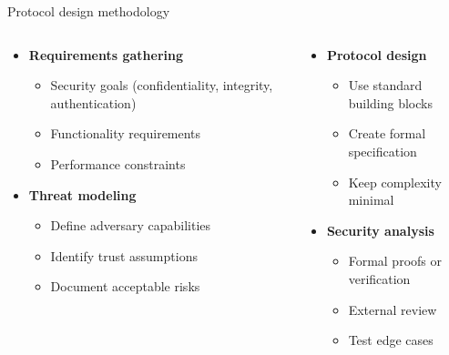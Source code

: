 \documentclass[aspectratio=169, lualatex, handout]{beamer}
\begin{document}
\begin{frame}{Protocol design methodology}
	\begin{columns}[c]
		\begin{column}{0.5\textwidth}
			\begin{itemize}
				\item \textbf{Requirements gathering}
				      \begin{itemize}
					      \item Security goals (confidentiality, integrity, authentication)
					      \item Functionality requirements
					      \item Performance constraints
				      \end{itemize}
				\item \textbf{Threat modeling}
				      \begin{itemize}
					      \item Define adversary capabilities
					      \item Identify trust assumptions
					      \item Document acceptable risks
				      \end{itemize}
			\end{itemize}
		\end{column}
		\begin{column}{0.5\textwidth}
			\begin{itemize}
				\item \textbf{Protocol design}
				      \begin{itemize}
					      \item Use standard building blocks
					      \item Create formal specification
					      \item Keep complexity minimal
				      \end{itemize}
				\item \textbf{Security analysis}
				      \begin{itemize}
					      \item Formal proofs or verification
					      \item External review
					      \item Test edge cases
				      \end{itemize}
			\end{itemize}
		\end{column}
	\end{columns}
\end{frame}
\end{document}
